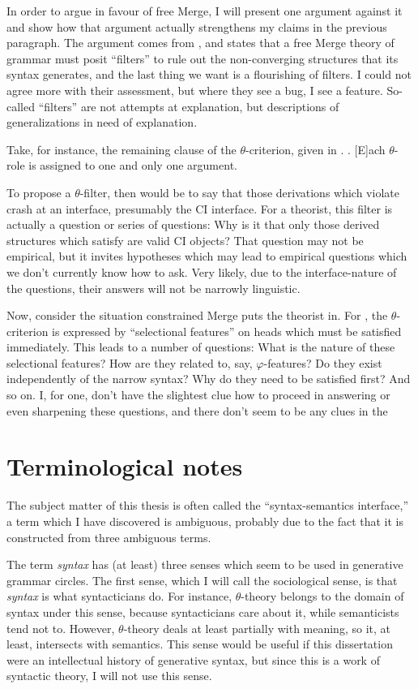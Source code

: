 \documentclass[MilwayThesis]{subfiles}
\begin{document}
In order to argue in favour of free Merge, I will present one argument against it and show how that argument actually strengthens my claims in the previous paragraph.
The argument comes from \textcite{frampton2008crash}, and states that a free Merge theory of grammar must posit ``filters'' to rule out the non-converging structures that its syntax generates, and the last thing we want is a flourishing of filters.
I could not agree more with their assessment, but where they see a bug, I see a feature.
So-called ``filters'' are not attempts at explanation, but descriptions of generalizations in need of explanation.

Take, for instance, the remaining clause of the $\theta$-criterion, given in \Next.
\ex. [E]ach $\theta$-role is assigned to one and only one argument. \parencite[36]{chomsky1981lectures}

To propose a $\theta$-filter, then would be to say that those derivations which violate \Last crash at an interface, presumably the CI interface.
For a theorist, this filter is actually a question or series of questions: Why is it that only those derived structures which satisfy \Last are valid CI objects?
That question may not be empirical, but it invites hypotheses which may lead to empirical questions which we don't currently know how to ask.
Very likely, due to the interface-nature of the questions, their answers will not be narrowly linguistic.

Now, consider the situation constrained Merge puts the theorist in.
For \textcite{frampton2008crash}, the $\theta$-criterion is expressed by ``selectional features'' on heads which must be satisfied immediately.
This leads to a number of questions: What is the nature of these selectional features?
How are they related to, say, $\varphi$-features?
Do they exist independently of the narrow syntax?
Why do they need to be satisfied first?
And so on.
I, for one, don't have the slightest clue how to proceed in answering or even sharpening these questions, and there don't seem to be any clues in the

\section{Terminological notes}
The subject matter of this thesis is often called the ``syntax-semantics interface,'' a term which I have discovered is ambiguous, probably due to the fact that it is constructed from three ambiguous terms.

The term \textit{syntax} has (at least) three senses which seem to be used in generative grammar circles.
The first sense, which I will call the sociological sense, is that \textit{syntax} is what syntacticians do.
For instance, $\theta$-theory belongs to the domain of syntax under this sense, because syntacticians care about it, while semanticists tend not to.
However, $\theta$-theory deals at least partially with meaning, so it, at least, intersects with semantics.
This sense would be useful if this dissertation were an intellectual history of generative syntax, but since this is a work of syntactic theory, I will not use this sense.
\end{document}
